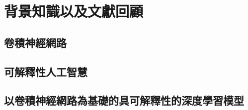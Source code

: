 \documentclass[class=NCU_thesis, crop=false]{standalone}
\begin{document}
\chapter{背景知識以及文獻回顧}
\section{卷積神經網路}


\section{可解釋性人工智慧}

\section{以卷積神經網路為基礎的具可解釋性的深度學習模型}
\end{document}
